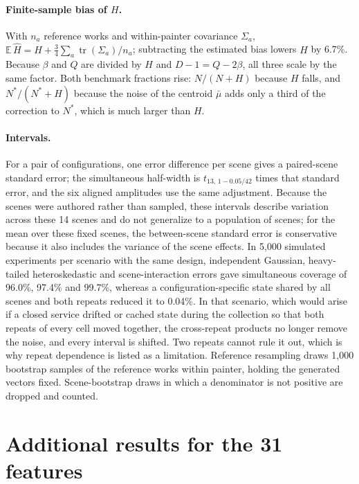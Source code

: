 \paragraph{Finite-sample bias of $H$.} With $n_a$ reference works and within-painter covariance
$\Sigma_a$, $\mathbb E\,\widehat H=H+\frac34\sum_a\operatorname{tr}(\Sigma_a)/n_a$; subtracting
the estimated bias lowers $H$ by 6.7\%. Because $\beta$ and $Q$ are divided by $H$ and
$D-1=Q-2\beta$, all three scale by the same factor. Both benchmark fractions rise: $N/(N+H)$
because $H$ falls, and $N^*/(N^*+H)$ because the noise of the centroid $\bar\mu$ adds only a third
of the correction to $N^*$, which is much larger than $H$.

\paragraph{Intervals.} For a pair of configurations, one error difference per scene gives a
paired-scene standard error; the simultaneous half-width is $t_{13,\,1-0.05/42}$ times that
standard error, and the six aligned amplitudes use the same adjustment. Because the scenes were
authored rather than sampled, these intervals describe variation across these 14 scenes and do
not generalize to a population of scenes; for the mean over these fixed scenes, the between-scene
standard error is conservative because it also includes the variance of the scene effects. In
5,000 simulated experiments per scenario with the same
design, independent Gaussian, heavy-tailed heteroskedastic and scene-interaction errors gave
simultaneous coverage of 96.0\%, 97.4\% and 99.7\%, whereas a configuration-specific state
shared by all scenes and both repeats reduced it to 0.04\%. In that scenario, which would arise if a
closed service drifted or cached state during the collection so that both repeats of every cell
moved together, the cross-repeat products no longer remove the noise, and every interval is shifted.
Two repeats cannot rule it out, which is why repeat dependence is listed as a limitation.
Reference resampling draws 1,000 bootstrap samples of the reference works within painter, holding
the generated vectors fixed. Scene-bootstrap draws in which a denominator is not positive are
dropped and counted.

\FloatBarrier
\section{Additional results for the 31 features}\label{app:hand}

